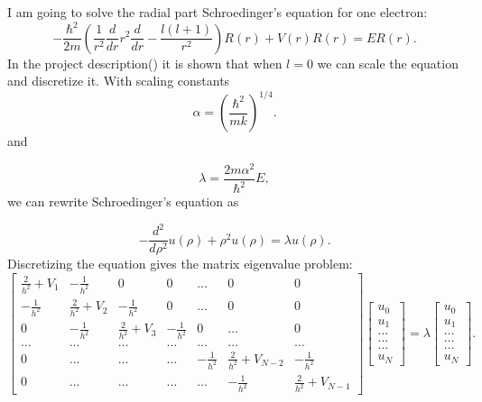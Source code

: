 \documentclass{article}
\begin{document}
I am going to solve the radial part Schroedinger's equation for one electron: 
$$
  -\frac{\hbar^2}{2 m} \left ( \frac{1}{r^2} \frac{d}{dr} r^2
  \frac{d}{dr} - \frac{l (l + 1)}{r^2} \right )R(r) 
     + V(r) R(r) = E R(r).
$$
In the project description(\cite{Projectdescription}) it is shown that when $l=0$ we can scale the equation and discretize it. With scaling constants
\begin{equation*}
\alpha = \left(\frac{\hbar^2}{mk}\right)^{1/4}.
\end{equation*}
and

\begin{equation*}
\lambda = \frac{2m\alpha^2}{\hbar^2}E,
\end{equation*}
we can rewrite Schroedinger's equation as

\begin{equation*}
  -\frac{d^2}{d\rho^2} u(\rho) + \rho^2u(\rho)  = \lambda u(\rho) .
\end{equation*}
Discretizing the equation gives the matrix eigenvalue problem:
$$
\begin{bmatrix} \frac{2}{h^2}+V_1 & -\frac{1}{h^2} & 0   & 0    & \dots  &0     & 0 \\
                                -\frac{1}{h^2} & \frac{2}{h^2}+V_2 & -\frac{1}{h^2} & 0    & \dots  &0     &0 \\
                                0   & -\frac{1}{h^2} & \frac{2}{h^2}+V_3 & -\frac{1}{h^2}  &0       &\dots & 0\\
                                \dots  & \dots & \dots & \dots  &\dots      &\dots & \dots\\
                                0   & \dots & \dots & \dots  &-\frac{1}{h^2}  &\frac{2}{h^2}+V_{N-2} & -\frac{1}{h^2}\\
                                0   & \dots & \dots & \dots  &\dots       &-\frac{1}{h^2} & \frac{2}{h^2}+V_{N-1}
             \end{bmatrix}  \begin{bmatrix} u_{0} \\
                                                              u_{1} \\
                                                              \dots\\ \dots\\ \dots\\
                                                              u_{N}
             \end{bmatrix}=\lambda \begin{bmatrix} u_{0} \\
                                                              u_{1} \\
                                                              \dots\\ \dots\\ \dots\\
                                                              u_{N}
             \end{bmatrix}.  
$$
\end{document}
